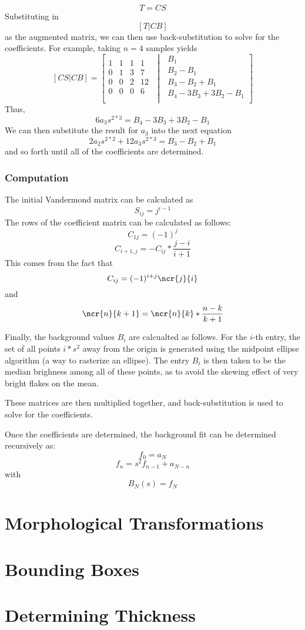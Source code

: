 \documentclass{article}
\begin{document}
\[T=CS\]
Substituting in
\[[T|CB]\]
as the augmented matrix, we can then use back-substitution to solve for the coefficients. For example, taking \(n=4\) samples yields
\[
	[CS\vert CB]=\left[\begin{matrix} 1 & 1 & 1 & 1\\
			0 & 1 & 3 & 7\\
			0 & 0 & 2 & 12\\
			0 & 0 & 0 & 6\\
		\end{matrix}
		\,\,\middle\vert\,\,\begin{matrix}
			B_1\\
			B_2-B_1\\
			B_3-B_2+B_1\\
			B_4-3B_3+3B_2-B_1\\
	\end{matrix}\right]
		\]
Thus,
\[6a_3 s^{2*3}= B_4-3B_3+3B_2-B_1\]
We can then substitute the result for \(a_3\) into the next equation
\[2a_2 s^{2*2}+12a_3s^{2*3} = B_3-B_2+B_1\]
and so forth until all of the coefficients are determined.

\subsubsection{Computation}
The initial Vandermond matrix can be calculated as
\[S_{ij}=j^{i-1}\]
The rows of the coefficient matrix can be calculated as follows:
\[C_{1j}=(-1)^j\]
\[C_{i+1,j}=-C_{ij}*\frac{j-i}{i+1}\]
This comes from the fact that
\[C_{ij}=(-1)^{i+j}\ncr{j}{i}\]
and
\[\ncr{n}{k+1}=\ncr{n}{k}*\frac{n-k}{k+1}\]

Finally, the background values \(B_i\) are calcualted as follows. For the \(i\)-th entry, the set of all points \(i*s^2\) away from the origin is generated using the midpoint ellipse algorithm (a way to rasterize an ellipse). The entry \(B_i\) is then taken to be the median brighness among all of these points, as to avoid the skewing effect of very bright flakes on the mean.

These matrices are then multiplied together, and back-substitution is used to solve for the coefficients. 

Once the coefficients are determined, the background fit can be determined recursively as:
\[f_0=a_N\]
\[f_{n} =s^2f_{n-1} +a_{N-n}\]
with
\[B_N(s)=f_N\]


\section{Morphological Transformations}
\section{Bounding Boxes}
\section{Determining Thickness}
\end{document}
